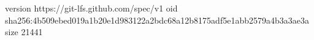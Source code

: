 version https://git-lfs.github.com/spec/v1
oid sha256:4b509ebed019a1b20e1d983122a2bdc68a12b8175adf5e1abb2579a4b3a3ae3a
size 21441
